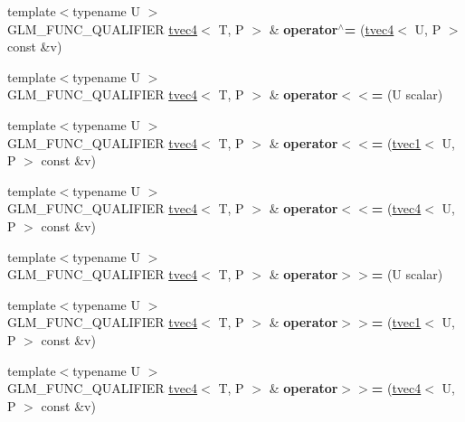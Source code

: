 \begin{DoxyCompactItemize}
\item 
\mbox{\label{structglm_1_1tvec4_afba73ecb49a4d69ef0e832b1e294e0ca}} 
{\footnotesize template$<$typename U $>$ }\\G\+L\+M\+\_\+\+F\+U\+N\+C\+\_\+\+Q\+U\+A\+L\+I\+F\+I\+ER \hyperlink{structglm_1_1tvec4}{tvec4}$<$ T, P $>$ \& {\bfseries operator$^\wedge$=} (\hyperlink{structglm_1_1tvec4}{tvec4}$<$ U, P $>$ const \&v)
\item 
\mbox{\label{structglm_1_1tvec4_a2c231e01de8005887fd9c380f93009da}} 
{\footnotesize template$<$typename U $>$ }\\G\+L\+M\+\_\+\+F\+U\+N\+C\+\_\+\+Q\+U\+A\+L\+I\+F\+I\+ER \hyperlink{structglm_1_1tvec4}{tvec4}$<$ T, P $>$ \& {\bfseries operator$<$$<$=} (U scalar)
\item 
\mbox{\label{structglm_1_1tvec4_ac1b4567b5baff2c335edef8d30e73a80}} 
{\footnotesize template$<$typename U $>$ }\\G\+L\+M\+\_\+\+F\+U\+N\+C\+\_\+\+Q\+U\+A\+L\+I\+F\+I\+ER \hyperlink{structglm_1_1tvec4}{tvec4}$<$ T, P $>$ \& {\bfseries operator$<$$<$=} (\hyperlink{structglm_1_1tvec1}{tvec1}$<$ U, P $>$ const \&v)
\item 
\mbox{\label{structglm_1_1tvec4_ab39a99917d9c3a7b93c1cf5cbfa93025}} 
{\footnotesize template$<$typename U $>$ }\\G\+L\+M\+\_\+\+F\+U\+N\+C\+\_\+\+Q\+U\+A\+L\+I\+F\+I\+ER \hyperlink{structglm_1_1tvec4}{tvec4}$<$ T, P $>$ \& {\bfseries operator$<$$<$=} (\hyperlink{structglm_1_1tvec4}{tvec4}$<$ U, P $>$ const \&v)
\item 
\mbox{\label{structglm_1_1tvec4_a538540f7df0325aa90d503b150dfa561}} 
{\footnotesize template$<$typename U $>$ }\\G\+L\+M\+\_\+\+F\+U\+N\+C\+\_\+\+Q\+U\+A\+L\+I\+F\+I\+ER \hyperlink{structglm_1_1tvec4}{tvec4}$<$ T, P $>$ \& {\bfseries operator$>$$>$=} (U scalar)
\item 
\mbox{\label{structglm_1_1tvec4_abfcea840ccebe4a644d60116955529ce}} 
{\footnotesize template$<$typename U $>$ }\\G\+L\+M\+\_\+\+F\+U\+N\+C\+\_\+\+Q\+U\+A\+L\+I\+F\+I\+ER \hyperlink{structglm_1_1tvec4}{tvec4}$<$ T, P $>$ \& {\bfseries operator$>$$>$=} (\hyperlink{structglm_1_1tvec1}{tvec1}$<$ U, P $>$ const \&v)
\item 
\mbox{\label{structglm_1_1tvec4_aafc6289fa58e4d84390259bf8287cb72}} 
{\footnotesize template$<$typename U $>$ }\\G\+L\+M\+\_\+\+F\+U\+N\+C\+\_\+\+Q\+U\+A\+L\+I\+F\+I\+ER \hyperlink{structglm_1_1tvec4}{tvec4}$<$ T, P $>$ \& {\bfseries operator$>$$>$=} (\hyperlink{structglm_1_1tvec4}{tvec4}$<$ U, P $>$ const \&v)
\end{DoxyCompactItemize}
